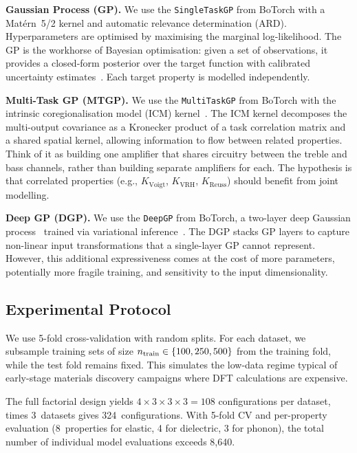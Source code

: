 \textbf{Gaussian Process (GP).}
We use the \texttt{SingleTaskGP} from BoTorch with a Mat{\'e}rn~5/2 kernel and automatic relevance determination (ARD).
Hyperparameters are optimised by maximising the marginal log-likelihood.
The GP is the workhorse of Bayesian optimisation: given a set of observations, it provides a closed-form posterior over the target function with calibrated uncertainty estimates~\cite{rasmussen2006gaussian}.
Each target property is modelled independently.

\textbf{Multi-Task GP (MTGP).}
We use the \texttt{MultiTaskGP} from BoTorch with the intrinsic coregionalisation model (ICM) kernel~\cite{bonilla2007multi}.
The ICM kernel decomposes the multi-output covariance as a Kronecker product of a task correlation matrix and a shared spatial kernel, allowing information to flow between related properties.
Think of it as building one amplifier that shares circuitry between the treble and bass channels, rather than building separate amplifiers for each.
The hypothesis is that correlated properties (e.g., $K_{\text{Voigt}}$, $K_{\text{VRH}}$, $K_{\text{Reuss}}$) should benefit from joint modelling.

\textbf{Deep GP (DGP).}
We use the \texttt{DeepGP} from BoTorch, a two-layer deep Gaussian process~\cite{damianou2013deep} trained via variational inference~\cite{dutordoir2021deep}.
The DGP stacks GP layers to capture non-linear input transformations that a single-layer GP cannot represent.
However, this additional expressiveness comes at the cost of more parameters, potentially more fragile training, and sensitivity to the input dimensionality.


\subsection{Experimental Protocol}
\label{sec:protocol}

We use 5-fold cross-validation with random splits.
For each dataset, we subsample training sets of size $n_{\text{train}} \in \{100, 250, 500\}$ from the training fold, while the test fold remains fixed.
This simulates the low-data regime typical of early-stage materials discovery campaigns where DFT calculations are expensive.

The full factorial design yields $4 \times 3 \times 3 \times 3 = 108$ configurations per dataset, times 3~datasets gives 324~configurations.
With 5-fold CV and per-property evaluation (8~properties for elastic, 4 for dielectric, 3 for phonon), the total number of individual model evaluations exceeds 8{,}640.

